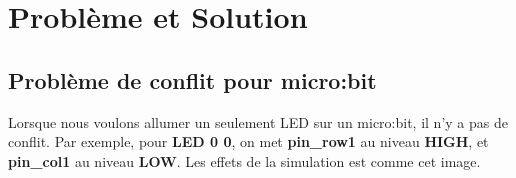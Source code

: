 \documentclass[14px]{article}
\begin{document}
	\section{Problème et Solution}
	\subsection{Problème de conflit pour micro:bit}
	Lorsque nous voulons allumer un seulement LED sur un micro:bit, il n'y a pas de conflit. Par exemple, pour \textbf{LED 0 0}, on met \textbf{pin\_row1} au niveau \textbf{HIGH}, et \textbf{pin\_col1} au niveau \textbf{LOW}. Les effets de la simulation est comme cet image.\\
	\begin{figure}[htbp]
	\end{figure}\\
	
\end{document}
